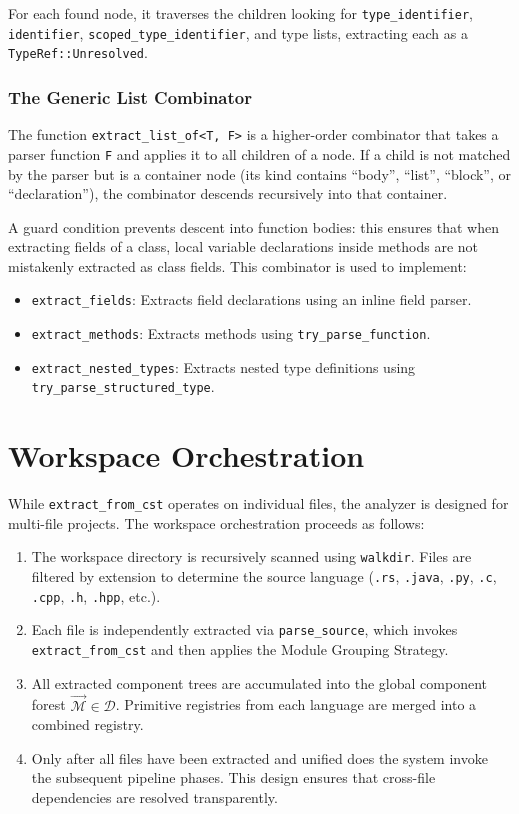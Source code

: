 For each found node, it traverses the children looking for
\texttt{type\_identifier}, \texttt{identifier},
\texttt{scoped\_type\_identifier}, and type lists, extracting each as
a \texttt{TypeRef::Unresolved}.

\subsubsection{The Generic List Combinator}

The function \texttt{extract\_list\_of<T, F>} is a higher-order
combinator that takes a parser function \texttt{F} and applies it to
all children of a node. If a child is not matched by the parser but
is a container node (its kind contains ``body'', ``list'', ``block'',
or ``declaration''), the combinator descends recursively into that container.

A guard condition prevents descent into function bodies: this ensures
that when extracting fields of a class, local variable declarations
inside methods are not mistakenly extracted as class fields. This
combinator is used to implement:
\begin{itemize}
  \item \texttt{extract\_fields}: Extracts field declarations using
    an inline field parser.
  \item \texttt{extract\_methods}: Extracts methods using
    \texttt{try\_parse\_function}.
  \item \texttt{extract\_nested\_types}: Extracts nested type
    definitions using \\ \texttt{try\_parse\_structured\_type}.
\end{itemize}

\section{Workspace Orchestration}
\label{sec:workspace_orchestration}

While \texttt{extract\_from\_cst} operates on individual files, the
analyzer is designed for multi-file projects. The workspace
orchestration proceeds as follows:

\begin{enumerate}
  \item The workspace directory is recursively scanned using
    \texttt{walkdir}. Files are filtered by extension to determine
    the source language (\texttt{.rs}, \texttt{.java}, \texttt{.py},
    \texttt{.c}, \texttt{.cpp}, \texttt{.h}, \texttt{.hpp}, etc.).
  \item Each file is independently extracted via
    \texttt{parse\_source}, which invokes \texttt{extract\_from\_cst}
    and then applies the Module Grouping Strategy.
  \item All extracted component trees are accumulated into the
    global component forest $\vec{\mathcal{M}} \in \mathcal{D}$. Primitive
    registries from each language are merged into a combined registry.
  \item Only after all files have been extracted and unified does the
    system invoke the subsequent pipeline phases. This design ensures
    that cross-file dependencies are resolved transparently.
\end{enumerate}

